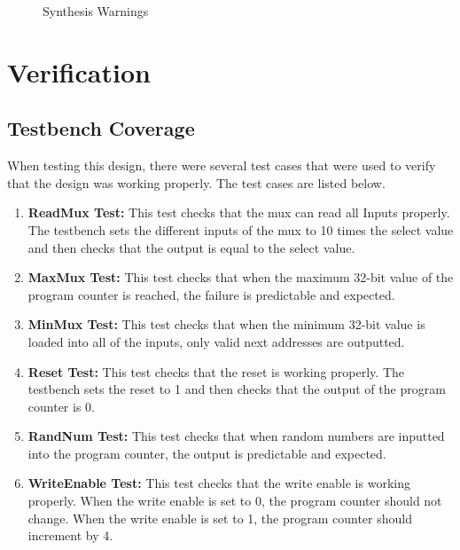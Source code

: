 \documentclass[
    a4paper, %
	12pt, %
    ]{CSSullivanBusinessReport}
\begin{document}
\begin{fullwidth}
\begin{figure}[H]
    \captionsetup{style=widetable}
    \caption{Synthesis Warnings}
    \label{fig:SynthesisWarnings}
\end{figure}

\section{Verification} %

\subsection{Testbench Coverage} %

When testing this design, there were several test cases that were used to verify that the design was working properly. The test cases are listed below.

\begin{enumerate}
    \item \textbf{ReadMux Test:} This test checks that the mux can read all Inputs properly. The testbench sets the different inputs of the mux to 10 times the select value and then checks that the output is equal to the select value.
    \item \textbf{MaxMux Test:} This test checks that when the maximum 32-bit value of the program counter is reached, the failure is predictable and expected.
    \item \textbf{MinMux Test:} This test checks that when the minimum 32-bit value is loaded into all of the inputs, only valid next addresses are outputted.
    \item \textbf{Reset Test:} This test checks that the reset is working properly. The testbench sets the reset to 1 and then checks that the output of the program counter is 0.
    \item \textbf{RandNum Test:} This test checks that when random numbers are inputted into the program counter, the output is predictable and expected. 
    \item \textbf{WriteEnable Test:} This test checks that the write enable is working properly. When the write enable is set to 0, the program counter should not change. When the write enable is set to 1, the program counter should increment by 4.
\end{enumerate}


\end{fullwidth}
\end{document}
